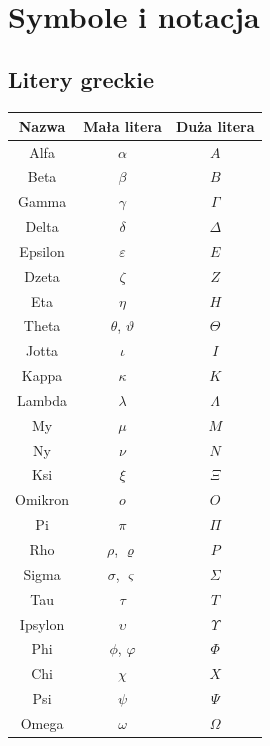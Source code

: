 \documentclass[14pt,a4paper]{extarticle}
\begin{document}

\begin{titlepage} %
\newpage
\
\end{titlepage}

\tableofcontents %

\cleardoublepage
{}




\section{Symbole i notacja}

\begin{multicols}{2}
\renewcommand{\arraystretch}{1.2}
\setlength{\arrayrulewidth}{0.5mm}

\subsection{Litery greckie}

\begin{tabular}{*{3}{|c}|}
\hline
Nazwa & Mała litera & Duża litera \\
\hline
Alfa & $\alpha $ & $A $ \\ 
Beta & $\beta $ & $B $ \\
Gamma & $\gamma $ & $\Gamma $ \\
Delta & $\delta $ & $\Delta $ \\
Epsilon & $\varepsilon $ & $E $ \\
Dzeta & $\zeta $ & $Z $ \\
Eta & $\eta $ & $H $ \\
Theta & $\theta$, $\vartheta $ & $\Theta $ \\
Jotta & $\iota $ & $I $ \\
Kappa & $\kappa $ & $K $ \\
Lambda & $\lambda $ & $\Lambda $ \\
My & $\mu $ & $M $ \\
Ny & $\nu $ & $N $ \\
Ksi & $\xi $ & $\Xi $ \\
Omikron & $o $ & $O $ \\
Pi & $\pi $ & $\Pi $ \\
Rho & $\rho$, $\varrho$ & $P $ \\
Sigma & $\sigma$, $\varsigma$ & $\Sigma $ \\
Tau & $\tau $ & $T $ \\
Ipsylon & $\upsilon $ & $\Upsilon $ \\
Phi & $\phi$, $\varphi $ & $\Phi $ \\
Chi & $\chi $ & $X $ \\
Psi & $\psi $ & $\Psi $ \\
Omega & $\omega $ & $\Omega $ \\
\hline
\end{tabular}
\\\\\\


\end{multicols}
\end{document}
